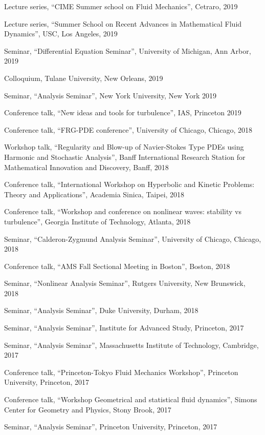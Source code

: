 \documentclass[10pt]{article}
\begin{document}
\begin{list}{}{\leftmargin=1em}
\item Lecture series, ``CIME Summer school on Fluid Mechanics'', Cetraro, 2019
\item Lecture series, ``Summer School on Recent Advances in Mathematical Fluid Dynamics'', USC, Los Angeles, 2019
\item Seminar, ``Differential Equation Seminar'', University of Michigan, Ann Arbor, 2019
\item Colloquium, Tulane University, New Orleans, 2019
\item Seminar, ``Analysis Seminar'', New York University, New York 2019
\item Conference talk, ``New ideas and tools for turbulence'', IAS, Princeton 2019
\item Conference talk, ``FRG-PDE conference'', University of Chicago, Chicago, 2018
\item Workshop talk, ``Regularity and Blow-up of Navier-Stokes Type PDEs using Harmonic and Stochastic Analysis'', Banff International
Research Station for Mathematical Innovation and Discovery, Banff, 2018
\item Conference talk, ``International Workshop on Hyperbolic and Kinetic Problems: Theory and Applications'', Academia Sinica, Taipei, 2018
\item Conference talk, ``Workshop and conference on nonlinear waves: stability vs turbulence'', Georgia Institute of Technology, Atlanta, 2018
\item Seminar, ``Calderon-Zygmund Analysis Seminar'', University of Chicago, Chicago, 2018
\item Conference talk, ``AMS Fall Sectional Meeting in Boston'', Boston, 2018
\item Seminar, ``Nonlinear Analysis Seminar'', Rutgers University, New Brunswick, 2018
\item Seminar, ``Analysis Seminar'', Duke University, Durham, 2018
\item Seminar, ``Analysis Seminar'', Institute for Advanced Study, Princeton, 2017
\item Seminar, ``Analysis Seminar'', Massachusetts Institute of Technology, Cambridge, 2017
\item Conference talk, ``Princeton-Tokyo Fluid Mechanics Workshop'', Princeton University, Princeton, 2017
\item Conference talk, ``Workshop Geometrical and statistical fluid dynamics'', Simons Center for Geometry and Physics, Stony Brook, 2017
\item Seminar, ``Analysis Seminar'', Princeton University, Princeton, 2017

\end{list}
\end{document}
